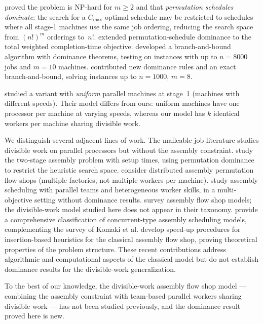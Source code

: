 \documentclass[11pt,titlepage]{article}
\begin{document}
\textcite{potts1995} proved the problem is NP-hard
for $m \geq 2$ and that \emph{permutation schedules
dominate}: the search for a $C_{\max}$-optimal schedule may be
restricted to schedules where all stage-1 machines use the same
job ordering, reducing the search space from $(n!)^m$ orderings
to~$n!$. \textcite{tozkapan2003}
extended permutation-schedule dominance to the total
weighted completion-time objective.
\textcite{hariri1997} developed
a branch-and-bound algorithm with dominance theorems,
testing on instances with up to $n = 8000$ jobs and $m = 10$ machines. \textcite{hadda2024} contributed new dominance rules
and an exact branch-and-bound, solving instances up to
$n = 1000$, $m = 8$.

\textcite{koulamas2007} studied a variant
with \emph{uniform} parallel machines at stage~1 (machines with
different speeds). Their model differs from ours: uniform
machines have one processor per machine at varying speeds,
whereas our model has $k$ identical workers per machine sharing
divisible work.

We distinguish several adjacent lines of work. The malleable-job
literature \parencite{drozdowski2009} studies divisible
work on parallel processors but without the assembly constraint.
\textcite{alanzi2007} study the two-stage
assembly problem with setup times, using permutation dominance
to restrict the heuristic search space. \textcite{hatami2013} consider distributed assembly
permutation flow shops (multiple factories, not multiple workers
per machine). \textcite{zhang2022} study assembly
scheduling with parallel teams and heterogeneous worker skills,
in a multi-objective setting without dominance results. \textcite{komaki2019} survey assembly flow
shop models; the divisible-work model studied here does not
appear in their taxonomy. \textcite{framinan2019} provide a comprehensive
classification of concurrent-type assembly scheduling models,
complementing the survey of Komaki et al.
\textcite{fv2022} develop
speed-up procedures for insertion-based heuristics for the
classical assembly flow shop, proving theoretical properties
of the problem structure. These recent contributions address
algorithmic and computational aspects of the classical model
but do not establish dominance results for the divisible-work
generalization.

To the best of our knowledge, the divisible-work assembly
flow shop model --- combining the assembly constraint with
team-based parallel workers sharing divisible work --- has not
been studied previously, and the dominance result proved here
is new.
\end{document}
